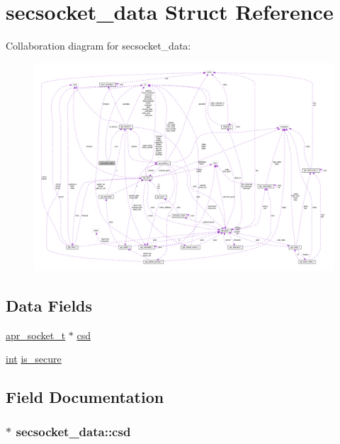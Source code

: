 \hypertarget{structsecsocket__data}{}\section{secsocket\+\_\+data Struct Reference}
\label{structsecsocket__data}


Collaboration diagram for secsocket\+\_\+data\+:
\nopagebreak
\begin{figure}[H]
\begin{center}
\leavevmode
\includegraphics[width=350pt]{structsecsocket__data__coll__graph}
\end{center}
\end{figure}
\subsection*{Data Fields}
\begin{DoxyCompactItemize}
\item 
\hyperlink{structapr__socket__t}{apr\+\_\+socket\+\_\+t} $\ast$ \hyperlink{structsecsocket__data_a70e1fd98c0a2e69ef99ce0d3220a640b}{csd}
\item 
\hyperlink{pcre_8txt_a42dfa4ff673c82d8efe7144098fbc198}{int} \hyperlink{structsecsocket__data_aea7a7bb32a30e02fbe925e548b72e9cb}{is\+\_\+secure}
\end{DoxyCompactItemize}


\subsection{Field Documentation}
\subsubsection[{\texorpdfstring{csd}{csd}}]{$\ast$ secsocket\+\_\+data\+::csd}\hypertarget{structsecsocket__data_a70e1fd98c0a2e69ef99ce0d3220a640b}{}\label{structsecsocket__data_a70e1fd98c0a2e69ef99ce0d3220a640b}
